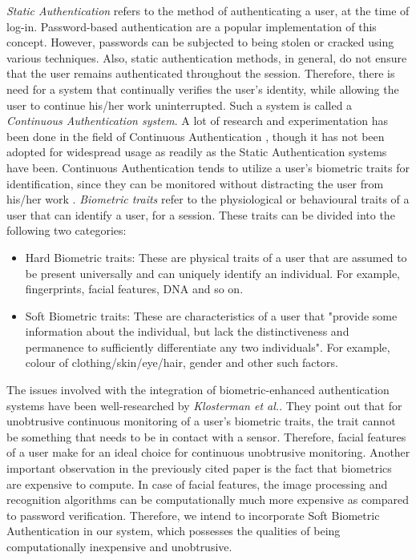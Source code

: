 \documentclass[%
        submission,
        notitlepage,
        narroweqnarray,
        inline,
        ]{ieee}
\begin{document}
\emph{Static Authentication} refers to the method of authenticating a user, at the time of log-in.
Password-based authentication are a popular implementation of this concept.
However, passwords can be subjected to being stolen or cracked using various techniques.
Also, static authentication methods, in general, do not ensure that the user remains authenticated throughout the session.
Therefore, there is need for a system that continually verifies the user's identity, while allowing the user to continue his/her work uninterrupted.
Such a system is called a \emph{Continuous Authentication system}.
A lot of research and experimentation has been done in the field of Continuous Authentication \cite{Niin10,Klos00,mon00,turk03,sim07,azz08,azz082}, though it has not been adopted for widespread usage as readily as the Static Authentication systems have been. Continuous Authentication tends to utilize a user's biometric traits for identification, since they can be monitored without distracting the user from his/her work \cite{Klos00}. \emph{Biometric traits} refer to the physiological or behavioural traits of a user that can identify a user, for a session. These traits can be divided into the following two categories:
\begin{itemize}
	\item Hard Biometric traits: These are physical traits of a user that are assumed to be present universally and can uniquely identify an individual. For example, fingerprints, facial features, DNA and so on.
	\item Soft Biometric traits: These are characteristics of a user that "provide some information about the individual, but lack the distinctiveness and permanence to sufficiently differentiate any two individuals"\cite{Jain204}. For example, colour of clothing/skin/eye/hair, gender and other such factors.
\end{itemize}

The issues involved with the integration of biometric-enhanced authentication systems have been well-researched by \emph {Klosterman et al.}\cite{Klos00}. They point out that for unobtrusive continuous monitoring of a user's biometric traits, the trait cannot be something that needs to be in contact with a sensor. Therefore, facial features of a user make for an ideal choice for continuous unobtrusive monitoring. Another important observation in the previously cited paper is the fact that biometrics are expensive to compute. In case of facial features, the image processing and recognition algorithms can be computationally much more expensive as compared to password verification. Therefore, we intend to incorporate Soft Biometric Authentication in our system, which possesses the qualities of being computationally inexpensive and unobtrusive.
\end{document}
